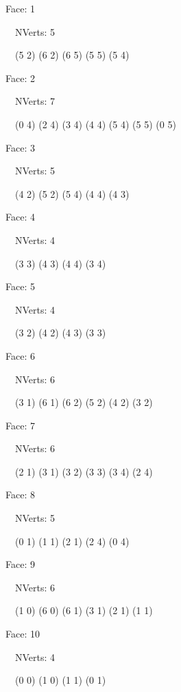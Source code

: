 \documentclass{article}
\begin{document}
{\footnotesize 

Face: 1

\   \    NVerts: 5

 \   \   (5 2) (6 2) (6 5) (5 5) (5 4)}

{\footnotesize 

Face: 2

\   \    NVerts: 7

 \   \   (0 4) (2 4) (3 4) (4 4) (5 4) (5 5) (0 5)}

{\footnotesize 

Face: 3

\   \    NVerts: 5

 \   \   (4 2) (5 2) (5 4) (4 4) (4 3)}

{\footnotesize 

Face: 4

\   \    NVerts: 4

 \   \   (3 3) (4 3) (4 4) (3 4)}

{\footnotesize 

Face: 5

\   \    NVerts: 4

 \   \   (3 2) (4 2) (4 3) (3 3)}

{\footnotesize 

Face: 6

\   \    NVerts: 6

 \   \   (3 1) (6 1) (6 2) (5 2) (4 2) (3 2)}

{\footnotesize 

Face: 7

\   \    NVerts: 6

 \   \   (2 1) (3 1) (3 2) (3 3) (3 4) (2 4)}

{\footnotesize 

Face: 8

\   \    NVerts: 5

 \   \   (0 1) (1 1) (2 1) (2 4) (0 4)}

{\footnotesize 

Face: 9

\   \    NVerts: 6

 \   \   (1 0) (6 0) (6 1) (3 1) (2 1) (1 1)}

{\footnotesize 

Face: 10

\   \    NVerts: 4

 \   \   (0 0) (1 0) (1 1) (0 1)}


 \newpage
\end{document}
